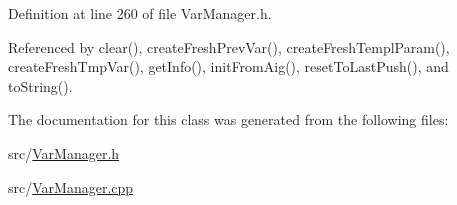 Definition at line 260 of file Var\-Manager.\-h.



Referenced by clear(), create\-Fresh\-Prev\-Var(), create\-Fresh\-Templ\-Param(), create\-Fresh\-Tmp\-Var(), get\-Info(), init\-From\-Aig(), reset\-To\-Last\-Push(), and to\-String().



The documentation for this class was generated from the following files\-:\begin{DoxyCompactItemize}
\item 
src/\hyperlink{VarManager_8h}{Var\-Manager.\-h}\item 
src/\hyperlink{VarManager_8cpp}{Var\-Manager.\-cpp}\end{DoxyCompactItemize}
